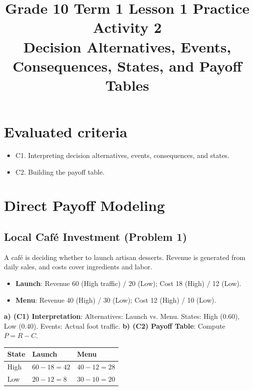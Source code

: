 \makeatletter {} \makeatother
   
\title{Grade 10 Term 1 Lesson 1 Practice Activity 2\\Decision Alternatives, Events, Consequences, States, and Payoff Tables} \author{} \date{}
 \maketitle
	
	\setcounter{tocdepth}{1} \setcounter{secnumdepth}{2}  \label{toc} \tableofcontents
	
	\section*{Evaluated criteria} \begin{itemize} \item C1. Interpreting decision alternatives, events, consequences, and states. \item C2. Building the payoff table. \end{itemize}
	
	\section{Direct Payoff Modeling} \label{sec:direct}
	
	\subsection{Local Café Investment (Problem 1)}
	A café is deciding whether to launch artisan desserts. Revenue is generated from daily sales, and costs cover ingredients and labor.
	\begin{itemize}
		\item \textbf{Launch}: Revenue 60 (High traffic) / 20 (Low); Cost 18 (High) / 12 (Low).
		\item \textbf{Menu}: Revenue 40 (High) / 30 (Low); Cost 12 (High) / 10 (Low).
	\end{itemize}
	\textbf{a) (C1) Interpretation}: Alternatives: Launch vs. Menu. States: High (0.60), Low (0.40). Events: Actual foot traffic.
	\textbf{b) (C2) Payoff Table}: Compute $P = R - C$.
	\begin{center} \begin{tabular}{lll} \toprule State & Launch & Menu \\ \midrule High & $60-18=42$ & $40-12=28$ \\ Low & $20-12=8$ & $30-10=20$ \\ \bottomrule \end{tabular} \end{center}
	
